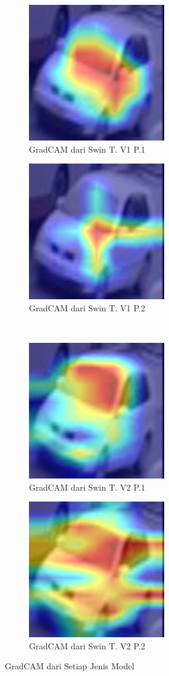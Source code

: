 \begin{figure}[h!]
  \centering
  \begin{subfigure}{.4\textwidth}
    \centering
    \includegraphics[width=.3\linewidth]{gambar/Que61_gradCAMV1P1IT3.jpg}
    \caption{GradCAM dari Swin T. V1 P.1}
    \label{gradcamkuerinomorenamsatuV1P1}
  \end{subfigure}%
  \begin{subfigure}{.4\textwidth}
    \centering
    \includegraphics[width=.3\linewidth]{gambar/Que61_gradCAMV1P2IT2.jpg}
    \caption{GradCAM dari Swin T. V1 P.2}
    \label{gradcamkuerinomorenamsatuV1P2}
  \end{subfigure}%
  \\
  \begin{subfigure}{.4\textwidth}
    \centering
    \includegraphics[width=.3\linewidth]{gambar/Que61_V2P1IT1.png}
    \caption{GradCAM dari Swin T. V2 P.1}
    \label{gradcamkuerinomorenamsatuV2P1}
  \end{subfigure}%
  \begin{subfigure}{.4\textwidth}
    \centering
    \includegraphics[width=.3\linewidth]{gambar/Que61_V2P2IT3.png}
    \caption{GradCAM dari Swin T. V2 P.2}
    \label{gradcamkuerinomorenamsatuV2P2}
  \end{subfigure}
  \caption{GradCAM dari Setiap Jenis Model}
  \label{fig:gradcamdarisetiapjenismodelpengujianketiga}
\end{figure}

